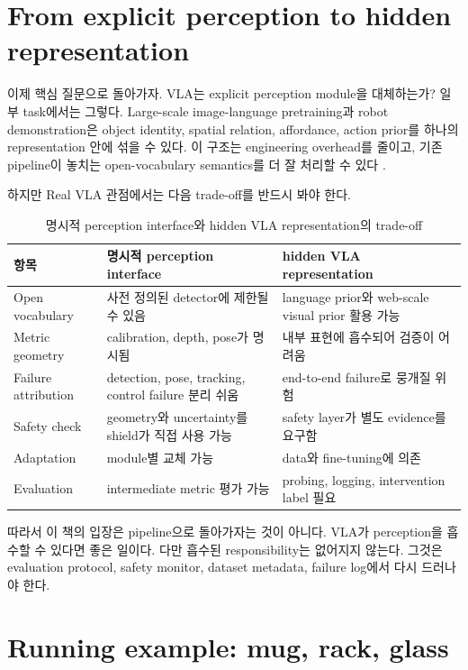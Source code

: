 \section{From explicit perception to hidden representation}

이제 핵심 질문으로 돌아가자. VLA는 explicit perception module을 대체하는가? 일부 task에서는 그렇다. Large-scale image-language pretraining과 robot demonstration은 object identity, spatial relation, affordance, action prior를 하나의 representation 안에 섞을 수 있다. 이 구조는 engineering overhead를 줄이고, 기존 pipeline이 놓치는 open-vocabulary semantics를 더 잘 처리할 수 있다 \cite{clip2021,flamingo2022,blip22023,openvla2024}.

하지만 Real VLA 관점에서는 다음 trade-off를 반드시 봐야 한다.

\begin{table}[ht]
\centering
\caption{명시적 perception interface와 hidden VLA representation의 trade-off}
\label{tab:explicit-hidden-perception}
\small
\begin{tabularx}{\textwidth}{p{28mm}X X}
\toprule
항목 & 명시적 perception interface & hidden VLA representation \\
\midrule
Open vocabulary & 사전 정의된 detector에 제한될 수 있음 & language prior와 web-scale visual prior 활용 가능 \\
Metric geometry & calibration, depth, pose가 명시됨 & 내부 표현에 흡수되어 검증이 어려움 \\
Failure attribution & detection, pose, tracking, control failure 분리 쉬움 & end-to-end failure로 뭉개질 위험 \\
Safety check & geometry와 uncertainty를 shield가 직접 사용 가능 & safety layer가 별도 evidence를 요구함 \\
Adaptation & module별 교체 가능 & data와 fine-tuning에 의존 \\
Evaluation & intermediate metric 평가 가능 & probing, logging, intervention label 필요 \\
\bottomrule
\end{tabularx}
\end{table}

따라서 이 책의 입장은 pipeline으로 돌아가자는 것이 아니다. VLA가 perception을 흡수할 수 있다면 좋은 일이다. 다만 흡수된 responsibility는 없어지지 않는다. 그것은 evaluation protocol, safety monitor, dataset metadata, failure log에서 다시 드러나야 한다.

\section{Running example: mug, rack, glass}

